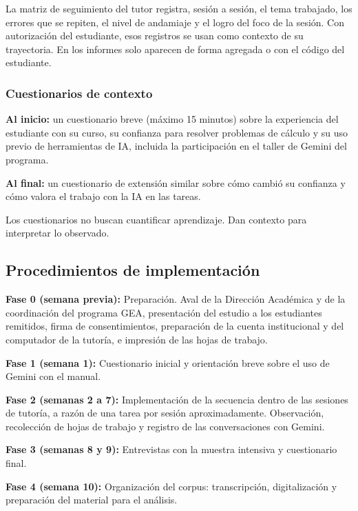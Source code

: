 La matriz de seguimiento del tutor registra, sesión a sesión, el tema trabajado, los errores que se repiten, el nivel de andamiaje y el logro del foco de la sesión. Con autorización del estudiante, esos registros se usan como contexto de su trayectoria. En los informes solo aparecen de forma agregada o con el código del estudiante.

\subsubsection{Cuestionarios de contexto}

\textbf{Al inicio:} un cuestionario breve (máximo 15 minutos) sobre la experiencia del estudiante con su curso, su confianza para resolver problemas de cálculo y su uso previo de herramientas de IA, incluida la participación en el taller de Gemini del programa.

\textbf{Al final:} un cuestionario de extensión similar sobre cómo cambió su confianza y cómo valora el trabajo con la IA en las tareas.

Los cuestionarios no buscan cuantificar aprendizaje. Dan contexto para interpretar lo observado.

\subsection{Procedimientos de implementación}

\textbf{Fase 0 (semana previa):} Preparación. Aval de la Dirección Académica y de la coordinación del programa GEA, presentación del estudio a los estudiantes remitidos, firma de consentimientos, preparación de la cuenta institucional y del computador de la tutoría, e impresión de las hojas de trabajo.

\textbf{Fase 1 (semana 1):} Cuestionario inicial y orientación breve sobre el uso de Gemini con el manual.

\textbf{Fase 2 (semanas 2 a 7):} Implementación de la secuencia dentro de las sesiones de tutoría, a razón de una tarea por sesión aproximadamente. Observación, recolección de hojas de trabajo y registro de las conversaciones con Gemini.

\textbf{Fase 3 (semanas 8 y 9):} Entrevistas con la muestra intensiva y cuestionario final.

\textbf{Fase 4 (semana 10):} Organización del corpus: transcripción, digitalización y preparación del material para el análisis.

